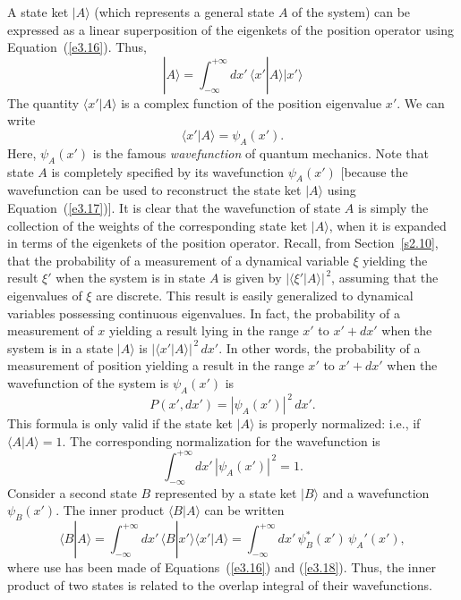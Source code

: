 A state ket $|A\rangle$ (which represents a general  state $A$ of the system)
can be expressed as a linear superposition of the eigenkets of the position
operator using Equation~(\ref{e3.16}). Thus,
\begin{equation}\label{e3.17}
|A\rangle = \int_{-\infty}^{+\infty} dx' \,\langle x'|A\rangle |x'\rangle
\end{equation}
The quantity $\langle x'|A\rangle$ is a complex function of the position eigenvalue
$x'$. We can write
\begin{equation}\label{e3.18}
\langle x'|A\rangle = \psi_A(x').
\end{equation}
Here, $\psi_A(x')$ is the famous {\em wavefunction}\/ of quantum mechanics. 
Note that state $A$ is completely specified by its wavefunction $\psi_A(x')$
[because the wavefunction can be used to reconstruct the state ket $|A\rangle$
using Equation~(\ref{e3.17})].
It is clear that the wavefunction of state $A$ is simply the collection
of the weights of the corresponding state ket $|A\rangle$,
when it is expanded in terms of the eigenkets of the
position operator. Recall, from Section~\ref{s2.10}, that the probability of
a measurement of a dynamical variable $\xi$ yielding the result $\xi'$ 
when the system is in state $A$ is given by
$|\langle \xi'|A\rangle|^{\,2}$, assuming that
the
eigenvalues of $\xi$ are discrete. This result is easily generalized to dynamical
variables possessing continuous eigenvalues. In fact, the probability of
a measurement of $x$ yielding a result lying in the range $x'$ to $x'+dx'$
when the system is in a state $|A\rangle$ is $|\langle x'|A\rangle|^{\,2}\,dx'$. 
In other words, the probability of a measurement of position yielding a
result in the range $x'$ to $x'+dx'$ when the wavefunction of the system is
$\psi_A(x')$ is
\begin{equation}\label{e3.19}
P(x', dx') = |\psi_A(x')|^{\,2}\, dx'.
\end{equation}
This formula is only valid if the state ket $|A\rangle$ is properly normalized:
{\rm i.e.}, if $\langle A|A\rangle = 1$. The corresponding normalization for
the wavefunction is
\begin{equation}\label{e3.20}
\int_{-\infty}^{+\infty} dx'\, |\psi_A(x')|^{\,2}= 1.
\end{equation}
Consider a second state $B$ represented by a state ket $|B\rangle$ and
a wavefunction $\psi_B(x')$. The inner product $\langle B| A\rangle$ 
can be written
\begin{equation}
\langle B| A\rangle = \int_{-\infty}^{+\infty} dx'\,\langle B| x'\rangle
\langle x' | A \rangle 
 = \int_{-\infty}^{+\infty} dx'\,\psi_B^\ast (x') \,\psi_A'(x'),
\end{equation}
where use has been made of Equations~(\ref{e3.16}) and (\ref{e3.18}). Thus, the inner product of two states is
related to the overlap integral of their wavefunctions. 

